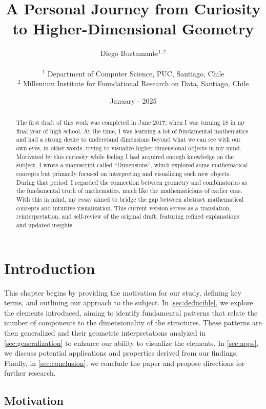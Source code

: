 \documentclass{article}
\title{A Personal Journey from Curiosity to Higher-Dimensional Geometry}
\date{January - 2025}
\author{%
	Diego Bustamante$^{1,2}$\\ \\
	{$^1$ Department of Computer Science, PUC, Santiago, Chile}\\
	{$^2$ Millenium Institute for Foundational Research on Data, Santiago, Chile}\\
}
\begin{document}
	\setcounter{page}{1}
	
	\maketitle

	\begin{abstract}
		The first draft of this work was completed in June 2017, when I was turning 18 in my final year of high school. At the time, I was learning a lot of fundamental mathematics and had a strong desire to understand dimensions beyond what we can see with our own eyes, in other words, trying to visualize higher-dimensional objects in my mind. Motivated by this curiosity while feeling I had acquired enough knowledge on the subject, I wrote a manuscript called ``Dimensions'', which explored some mathematical concepts but primarily focused on interpreting and visualizing such new objects. During that period, I regarded the connection between geometry and combinatorics as the fundamental truth of mathematics, much like the mathematicians of earlier eras. With this in mind, my essay aimed to bridge the gap between abstract mathematical concepts and intuitive visualization. This current version serves as a translation, reinterpretation, and self-review of the original draft, featuring refined explanations and updated insights.
	\end{abstract}

	\section{Introduction \label{sec:intro}}
	
	This chapter begins by providing the motivation for our study, defining key terms, and outlining our approach to the subject. In \autoref{sec:deducible}, we explore the elements introduced, aiming to identify fundamental patterns that relate the number of components to the dimensionality of the structures. These patterns are then generalized and their geometric interpretations analyzed in \autoref{sec:generalization} to enhance our ability to visualize the elements. In \autoref{sec:apps}, we discuss potential applications and properties derived from our findings. Finally, in \autoref{sec:conclusion}, we conclude the paper and propose directions for further research.
		
	\subsection{Motivation}
	
\end{document}
